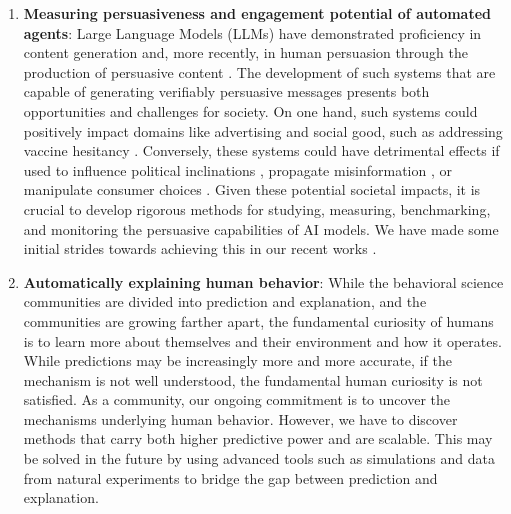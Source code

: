 \begin{enumerate}
    \item \textbf{Measuring persuasiveness and engagement potential of automated agents}: Large Language Models (LLMs) have demonstrated proficiency in content generation and, more recently, in human persuasion through the production of persuasive content \cite{durmus2024persuasion,singh2024measuring}. The development of such systems that are capable of generating verifiably persuasive messages presents both opportunities and challenges for society. On one hand, such systems could positively impact domains like advertising and social good, such as addressing vaccine hesitancy \cite{sekar2021domestic,PRWeek_DefeatDespairCOVID19}. Conversely, these systems could have detrimental effects if used to influence political inclinations \cite{tappin2023quantifying}, propagate misinformation \cite{lukito2020coordinating}, or manipulate consumer choices \cite{boerman2017online}. Given these potential societal impacts, it is crucial to develop rigorous methods for studying, measuring, benchmarking, and monitoring the persuasive capabilities of AI models. We have made some initial strides towards achieving this in our recent works \cite{singh2024measuring,khurana2023behavior}.


    \item \textbf{Automatically explaining human behavior}: While the behavioral science communities are divided into prediction and explanation, and the communities are growing farther apart, the fundamental curiosity of humans is to learn more about themselves and their environment and how it operates. While predictions may be increasingly more and more accurate, if the mechanism is not well understood, the fundamental human curiosity is not satisfied. As a community, our ongoing commitment is to uncover the mechanisms underlying human behavior. However, we have to discover methods that carry both higher predictive power and are scalable. This may be solved in the future by using advanced tools such as simulations and data from natural experiments to bridge the gap between prediction and explanation.



\end{enumerate}
